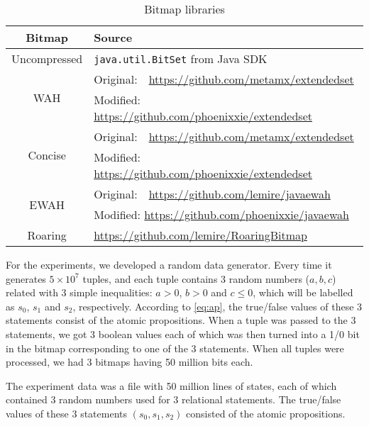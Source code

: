 \begin{table}
\centering
\begin{tabular}{|c|l|}
\hline
Bitmap & Source \\
\hline
Uncompressed & \texttt{java.util.BitSet} from Java SDK \\
\hline
\multirow{2}{*}{WAH} & Original:\ \ \url{https://github.com/metamx/extendedset} \\
& Modified: \url{https://github.com/phoenixxie/extendedset} \\
\hline
\multirow{2}{*}{Concise} & Original:\ \ \url{https://github.com/metamx/extendedset} \\
& Modified: \url{https://github.com/phoenixxie/extendedset} \\
\hline
\multirow{2}{*}{EWAH} & Original:\ \ \url{https://github.com/lemire/javaewah} \\
& Modified: \url{https://github.com/phoenixxie/javaewah} \\
\hline
Roaring & \url{https://github.com/lemire/RoaringBitmap} \\
\hline
\end{tabular}
\caption{Bitmap libraries}
\label{table:bmlibs}
\end{table}

For the experiments, we developed a random data generator. Every time it generates $5 \times 10^7$ tuples, and each tuple contains 3 random numbers ($a, b, c$) related with 3 simple inequalities: $a > 0$, $b > 0$ and $c \leq 0$, which will be labelled as $s_0$, $s_1$ and $s_2$, respectively. According to \eqref{eq:ap}, the true/false values of these 3 statements consist of the atomic propositions. When a tuple was passed to the 3 statements, we got 3 boolean values each of which was then turned into a 1/0 bit in the bitmap corresponding to one of the 3 statements. When all tuples were processed, we had 3 bitmaps having 50 million bits each.

The experiment data was a file with 50 million lines of states, each of which contained 3 random numbers used for 3 relational statements. The true/false values of these 3 statements $(s_0, s_1, s_2)$ consisted of the atomic propositions.


